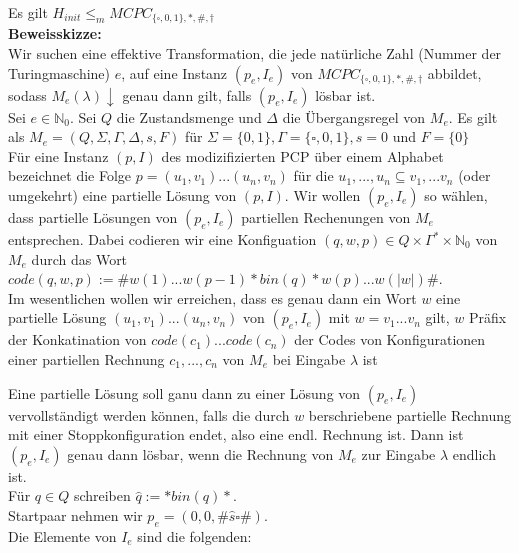 
\begin{lemma}{}
    Es gilt $H_{init} \leq_m MCPC_{\{\square, 0,1\},*,\#,\dagger}$ \\

    \textbf{Beweisskizze:} \\
    Wir suchen eine effektive Transformation, die jede natürliche Zahl (Nummer der Turingmaschine) $e$, auf eine 
    Instanz $(p_e,I_e)$ von $MCPC_{\{\square, 0,1\},*,\#,\dagger}$ abbildet, sodass $M_e(\lambda)\downarrow$ genau dann gilt,
    falls $(p_e,I_e)$ lösbar ist. \\

    Sei $e \in \mathbb{N}_0$. Sei $Q$ die Zustandsmenge und $\Delta$ die Übergangsregel von $M_e$.
    Es gilt als $M_e=(Q,\Sigma, \Gamma, \Delta, s, F)$ für $\Sigma = \{0,1\}, \Gamma = \{\square,0,1\}, s=0$ und $F=\{0\}$ \\

    
    Für eine Instanz $(p,I)$ des modizifizierten PCP über einem Alphabet bezeichnet die Folge 
    $p = (u_1,v_1)...(u_n,v_n)$ für die $u_1,...,u_n \subseteq v_1,...v_n$ (oder umgekehrt) eine partielle Lösung von
    $(p,I)$. Wir wollen $(p_e,I_e)$ so wählen, dass partielle Lösungen von $(p_e,I_e)$ partiellen Rechenungen von $M_e$ entsprechen. 
    Dabei codieren wir eine Konfiguation $(q,w,p) \in Q \times \Gamma^* \times \mathbb{N}_0$ von $M_e$ durch das Wort
    $code(q,w,p) := \#w(1)...w(p-1)*bin(q)*w(p)...w(\vert w \vert)\#$. \\

    Im wesentlichen wollen wir erreichen, dass es genau dann ein Wort $w$ eine partielle Lösung $(u_1,v_1)...(u_n,v_n)$
    von $(p_e,I_e)$ mit $w = v_1...v_n$ gilt, $w$ Präfix der Konkatination von $code(c_1)...code(c_n)$ der Codes von Konfigurationen
    einer partiellen Rechnung $c_1,...,c_n$ von $M_e$ bei Eingabe $\lambda$ ist

    Eine partielle Lösung soll ganu dann zu einer Lösung von $(p_e,I_e)$ vervollständigt werden können, falls die durch $w$ berschriebene 
    partielle Rechnung mit einer Stoppkonfiguration endet, also eine endl. Rechnung ist. Dann ist $(p_e, I_e)$ genau dann lösbar, wenn 
    die Rechnung von $M_e$ zur Eingabe $\lambda$ endlich ist. \\

    Für $q \in Q$ schreiben $\hat{q} := * bin(q) *.$ \\
    Startpaar nehmen wir $p_e = (0,0,\# \hat{s} \square \#)$. \\
    Die Elemente von $I_e$ sind die folgenden:
    

\end{lemma}
